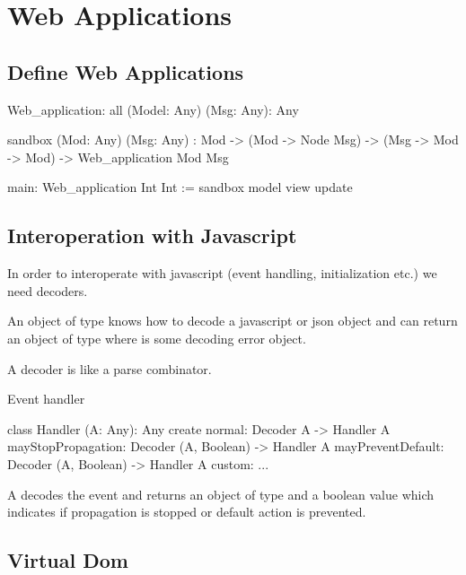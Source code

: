 \chapter{Web Applications}
\label{chapter:web}

\section{Define Web Applications}


\begin{alba}
    Web_application: all (Model: Any) (Msg: Any): Any

    sandbox (Mod: Any) (Msg: Any)
        :
        Mod
        -> (Mod -> Node Msg)
        -> (Msg -> Mod -> Mod)
        -> Web_application Mod Msg

    main: Web_application Int Int :=
        sandbox model view update
\end{alba}







\section{Interoperation with Javascript}

In order to interoperate with javascript (event handling, initialization etc.)
we need decoders.

An object of type  knows how to decode a javascript or json
object and can return an object of type  where
 is some decoding error object.

A decoder is like a parse combinator.


Event handler

\begin{alba}
    class
        Handler (A: Any): Any
    create
        normal: Decoder A -> Handler A
        mayStopPropagation: Decoder (A, Boolean) -> Handler A
        mayPreventDefault:  Decoder (A, Boolean) -> Handler A
        custom: ...
\end{alba}

A  decodes the event and returns an object of type
 and a boolean value which indicates if propagation is stopped or
default action is prevented.

\vskip 5mm
\section{Virtual Dom}

